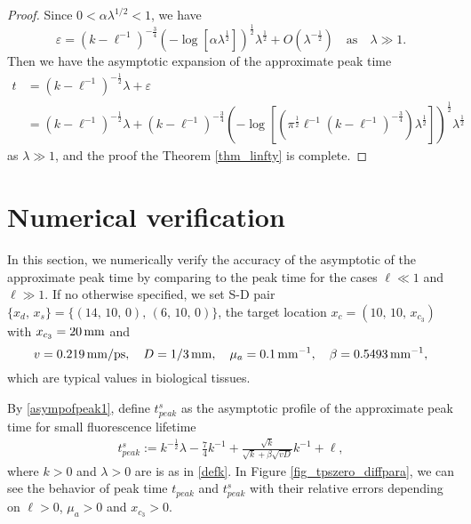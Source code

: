 \documentclass[10pt]{article}
\numberwithin{equation}{section}
\numberwithin{figure}{section}
\begin{document}
\begin{proof}
Since $0<\alpha \lambda^{1/2} <1$, we have 
$$
\varepsilon =  (k-\ell^{-1})^{-\frac{3}{4}} \left( -\log\left[ \alpha \lambda^\frac{1}{2} \right] \right)^\frac{1}{2} \lambda^\frac{1}{2} + O\left( \lambda^{-\frac{1}{2}} \right) \quad \mbox{as} \quad \lambda \gg 1.
$$
Then we have the asymptotic expansion of the approximate peak time
\begin{equation}\label{eq_peaktime}
\begin{split}
t &= (k-\ell^{-1})^{-\frac{1}{2}} \lambda + \varepsilon \\
&=(k-\ell^{-1})^{-\frac{1}{2}} \lambda + (k-\ell^{-1})^{-\frac{3}{4}} \left( -\log\left[ (\pi^{\frac{1}{2}} \ell^{-1} (k-\ell^{-1})^{-\frac{3}{4}}) \lambda^\frac{1}{2} \right] \right)^\frac{1}{2} \lambda^\frac{1}{2} 
\end{split}
\end{equation}
as $\lambda \gg 1$, and the proof the Theorem \ref{thm_linfty} is complete.
\end{proof}

\section{Numerical verification}\label{sec_numeric}
In this section,  we numerically verify the accuracy of the asymptotic of the approximate peak time by comparing to the peak time for the cases $\ell \ll 1$ and $\ell \gg 1$. If no otherwise specified, we set  S-D pair $\{x_{d},\,x_{s}\}=\{(14,\,10,\,0),\,(6,\,10,\,0)\}$, the target location $x_{c}=(10,\,10,\,x_{c_3})$ with $x_{c_3}=20\,{\rm mm}$ and 
\begin{equation}\label{phys_para}
v=0.219\, {\rm mm/ps},\quad D=1/3\,{\rm mm},\quad \mu_a=0.1\,{\rm mm^{-1}},\quad \beta=0.5493\, {\rm mm^{-1}},
\end{equation}
which are typical values in biological tissues. 
\begin{comment}
In Figure \ref{fig_tps_diffpara},
we show the numerical results for fixed S-D pair $\{x_{d},\,x_{s}\}=\{(14,\,10,\,0),\,(6,\,10,\,0)\}$, the projected location of the target $x_{c}=(10,\,10,\,x_{c_3})$ and changed $x_{c_3},\,D,\,\mu_a,\,\ell$.
\end{comment}
By \eqref{asympofpeak1}, define $t_{peak}^s$ as the asymptotic profile of the approximate peak time for small fluorescence lifetime 
\begin{equation}\label{asymptotic1}
\begin{split}
t_{peak}^s :=  k^{-\frac{1}{2}}\lambda - \frac{7}{4}k^{-1} + \frac{\sqrt{k}}{\sqrt{k}+\beta\sqrt{vD}}k^{-1} + \ell,
\end{split}
\end{equation}
where $k>0$ and $\lambda>0$ are is as in \eqref{defk}.
In Figure \ref{fig_tpszero_diffpara}, we can see the behavior of peak time $t_{peak}$ and $t_{peak}^s$ with their relative errors depending on $\ell>0$, $\mu_a>0$ and $x_{c_3}>0$.
\end{document}
